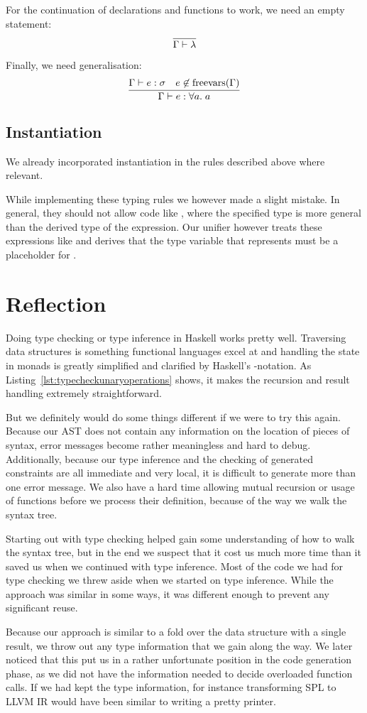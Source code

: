 For the continuation of declarations and functions to work, we need an empty statement:
\[
    \infer{\Gamma \vdash \lambda}{}
\]

Finally, we need generalisation:
\[
    \infer{\Gamma \vdash e : \forall a.\; a}{
        \Gamma \vdash e : \sigma &
        e \not\in \operatorname{freevars}(\Gamma)
    }
\]


\subsection{Instantiation}

We already incorporated instantiation in the rules described above where relevant.

While implementing these typing rules we however made a slight mistake.
In general, they should not allow code like , where the specified type is more general than the derived type of the expression.
Our unifier however treats these expressions like  and derives that the type variable that  represents must be a placeholder for .

\section{Reflection}

Doing type checking or type inference in Haskell works pretty well.
Traversing data structures is something functional languages excel at and handling the state in monads is greatly simplified and clarified by Haskell's -notation.
As Listing~\ref{lst:typecheckunaryoperations} shows, it makes the recursion and result handling extremely straightforward.

But we definitely would do some things different if we were to try this again.
Because our AST does not contain any information on the location of pieces of syntax, error messages become rather meaningless and hard to debug.
Additionally, because our type inference and the checking of generated constraints are all immediate and very local, it is difficult to generate more than one error message.
We also have a hard time allowing mutual recursion or usage of functions before we process their definition, because of the way we walk the syntax tree.

Starting out with type checking helped gain some understanding of how to walk the syntax tree, but in the end we suspect that it cost us much more time than it saved us when we continued with type inference.
Most of the code we had for type checking we threw aside when we started on type inference.
While the approach was similar in some ways, it was different enough to prevent any significant reuse.

Because our approach is similar to a fold over the data structure with a single result, we throw out any type information that we gain along the way.
We later noticed that this put us in a rather unfortunate position in the code generation phase, as we did not have the information needed to decide overloaded function calls.
If we had kept the type information, for instance transforming SPL to LLVM IR would have been similar to writing a pretty printer.


